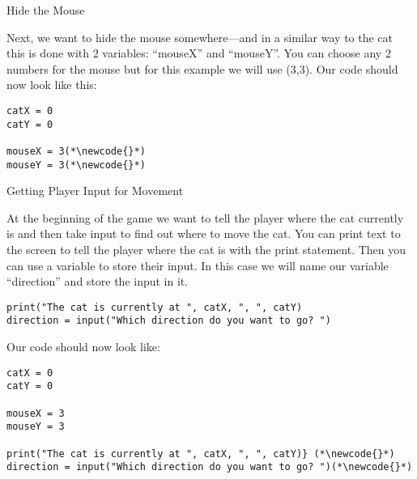 \documentclass[12pt,oneside]{article}
\newcommand{\q}[1]{``#1''}
\newcommand{\subsectitle}[1]{
  \begin{flushleft}{\large#1}\end{flushleft}
}
\newcommand{\newcode}[0]{\hfill<--}
\begin{document}
\begin{minipage}{\textwidth}
\subsectitle{Hide the Mouse}

Next, we want to hide the mouse somewhere---and in a similar way to the cat this is done with 2 variables: \q{mouseX} and \q{mouseY}. You can choose any 2 numbers for the mouse but for this example we will use (3,3). Our code should now look like this:

\begin{lstlisting}
catX = 0
catY = 0

mouseX = 3(*\newcode{}*)
mouseY = 3(*\newcode{}*)
\end{lstlisting}
\end{minipage}


\begin{minipage}{\textwidth}
\subsectitle{Getting Player Input for Movement}

At the beginning of the game we want to tell the player where the cat currently is and then take input to find out where to move the cat. You can print text to the screen to tell the player where the cat is with the print statement. Then you can use a variable to store their input. In this case we will name our variable \q{direction} and store the input in it.

\begin{lstlisting}
print("The cat is currently at ", catX, ", ", catY)
direction = input("Which direction do you want to go? ")
\end{lstlisting}

Our code should now look like:

\begin{lstlisting}
catX = 0
catY = 0

mouseX = 3
mouseY = 3

print("The cat is currently at ", catX, ", ", catY)} (*\newcode{}*)
direction = input("Which direction do you want to go? ")(*\newcode{}*)
\end{lstlisting}
\end{minipage}
\end{document}
